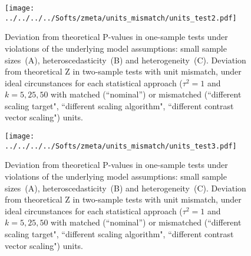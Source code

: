 \documentclass[preprint]{elsarticle}
\newcommand{\nStudies}{k}
\newcommand{\varBetween}{\tau^2}
\begin{document}
\begin{figure}[h]
	\centering
 	\texttt{[image: ../../../../Softs/zmeta/units\_mismatch/units\_test2.pdf]}
	\caption{Deviation from theoretical P-values in one-sample tests under violations of the underlying model assumptions: small sample sizes~(A), heteroscedasticity~(B) and heterogeneity~(C). Deviation from theoretical Z in two-sample tests with unit mismatch, under ideal circunstances for each statistical approach ($\varBetween=1$ and $\nStudies = 5, 25, 50$ with matched (``nominal'') or mismatched (``different scaling target", ``different scaling algorithm", ``different contrast vector scaling") units.}
	\label{fig:units_test2}
\end{figure}

\begin{figure}[h]
	\centering
 	\texttt{[image: ../../../../Softs/zmeta/units\_mismatch/units\_test3.pdf]}
	\caption{Deviation from theoretical P-values in one-sample tests under violations of the underlying model assumptions: small sample sizes~(A), heteroscedasticity~(B) and heterogeneity~(C). Deviation from theoretical Z in two-sample tests with unit mismatch, under ideal circunstances for each statistical approach ($\varBetween=1$ and $\nStudies = 5, 25, 50$ with matched (``nominal'') or mismatched (``different scaling target", ``different scaling algorithm", ``different contrast vector scaling") units.}
	\label{fig:units_test3}
\end{figure}








\end{document}
